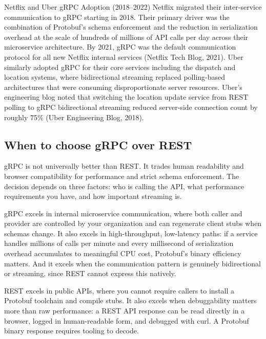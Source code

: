 \documentclass[11pt,a4paper]{article}
\begin{document}
\begin{industrybox}{Netflix and Uber gRPC Adoption (2018--2022)}
Netflix migrated their inter-service communication to gRPC starting in 2018. Their primary driver was the combination of Protobuf's schema enforcement and the reduction in serialization overhead at the scale of hundreds of millions of API calls per day across their microservice architecture. By 2021, gRPC was the default communication protocol for all new Netflix internal services (Netflix Tech Blog, 2021). Uber similarly adopted gRPC for their core services including the dispatch and location systems, where bidirectional streaming replaced polling-based architectures that were consuming disproportionate server resources. Uber's engineering blog noted that switching the location update service from REST polling to gRPC bidirectional streaming reduced server-side connection count by roughly 75\% (Uber Engineering Blog, 2018).
\end{industrybox}

\subsection{When to choose gRPC over REST}

gRPC is not universally better than REST. It trades human readability and browser compatibility for performance and strict schema enforcement. The decision depends on three factors: who is calling the API, what performance requirements you have, and how important streaming is.

gRPC excels in internal microservice communication, where both caller and provider are controlled by your organization and can regenerate client stubs when schemas change. It also excels in high-throughput, low-latency paths: if a service handles millions of calls per minute and every millisecond of serialization overhead accumulates to meaningful CPU cost, Protobuf's binary efficiency matters. And it excels when the communication pattern is genuinely bidirectional or streaming, since REST cannot express this natively.

REST excels in public APIs, where you cannot require callers to install a Protobuf toolchain and compile stubs. It also excels when debuggability matters more than raw performance: a REST API response can be read directly in a browser, logged in human-readable form, and debugged with curl. A Protobuf binary response requires tooling to decode.

\end{document}
